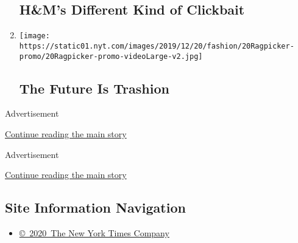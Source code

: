 \begin{enumerate}
  \href{/2019/12/18/fashion/hms-supply-chain-transparency.html}{}

  \hypertarget{hms-different-kind-of-clickbait}{%
  \subsection{H\&M's Different Kind of
  Clickbait}\label{hms-different-kind-of-clickbait}}
\item
  \texttt{[image: https://static01.nyt.com/images/2019/12/20/fashion/20Ragpicker-promo/20Ragpicker-promo-videoLarge-v2.jpg]}

  \href{/2019/12/20/style/zero-waste-daniel-trashion.html}{}

  \hypertarget{the-future-is-trashion}{%
  \subsection{The Future Is Trashion}\label{the-future-is-trashion}}
\end{enumerate}

Advertisement

\protect\hyperlink{after-mid2}{Continue reading the main story}

Advertisement

\protect\hyperlink{after-bottom}{Continue reading the main story}

\hypertarget{site-information-navigation}{%
\subsection{Site Information
Navigation}\label{site-information-navigation}}

\begin{itemize}
\tightlist
\item
  \href{https://help.nytimes.com/hc/en-us/articles/115014792127-Copyright-notice}{©~2020~The
  New York Times Company}
\end{itemize}

